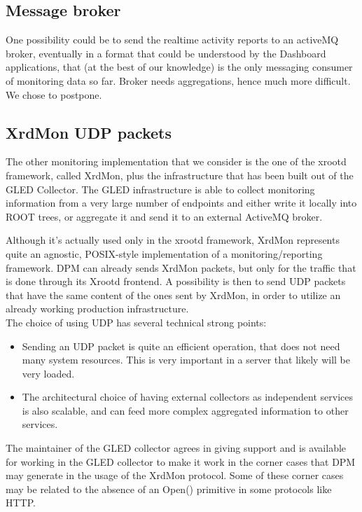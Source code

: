 \documentclass[12pt]{article} %
\begin{document}
\subsection{Message broker}

One possibility could be to send the realtime activity reports to an activeMQ broker, eventually in a format that could be understood by the Dashboard applications, that (at the best of our knowledge) is the only messaging consumer of monitoring data so far.
Broker needs aggregations, hence much more difficult. We chose to postpone.

\subsection{XrdMon UDP packets}

The other monitoring implementation that we consider is the one of the xrootd framework, called XrdMon, plus the infrastructure that has been built out of the GLED Collector. The GLED infrastructure is able to collect monitoring information from a very large number of endpoints and either write it locally into ROOT trees, or aggregate it and send it to an external ActiveMQ broker.

Although it's actually used only in the xrootd framework, XrdMon represents quite an agnostic, POSIX-style implementation of a monitoring/reporting framework. DPM can already sends XrdMon packets, but only for the traffic that is done through its Xrootd frontend. A possibility is then to send UDP packets that have the same content of the ones sent by XrdMon, in order to utilize an already working production infrastructure.\\

The choice of using UDP has several technical strong points:
\begin{itemize}
  \item Sending an UDP packet is quite an efficient operation, that does not need many system resources. This is very important in a server that likely will be very loaded.
  \item The architectural choice of having external collectors as independent services is also scalable, and can feed more complex aggregated information to other services.
\end{itemize}

 The maintainer of the GLED collector agrees in giving support and is available for working in the GLED collector to make it
work in the corner cases that DPM may generate in the usage of the XrdMon protocol. Some of these corner cases may be related
to the absence of an Open() primitive in some protocols like HTTP. 
\end{document}
